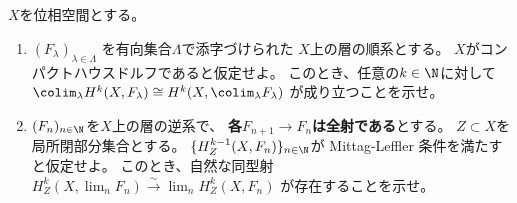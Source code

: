 \documentclass[uplatex,dvipdfmx]{jsarticle}
\begin{document}
\maketitle
\HeaderCommentA
\section{}

\fi



\begin{prob}\label{2.12}
  \(X\)を位相空間とする。
  \begin{enumerate}
    \item \label{2.12.1}
    \((F_{\lambda})_{\lambda\in \Lambda}\)
    を有向集合\(\Lambda\)で添字づけられた
    \(X\)上の層の順系とする。
    \(X\)がコンパクトハウスドルフであると仮定せよ。
    このとき、任意の\(k\in \N\)に対して
    \(\colim_{\lambda}H^k(X,F_{\lambda}) \cong
    H^k(X,\colim_{\lambda}F_{\lambda})\)
    が成り立つことを示せ。
    \item \label{2.12.2}
    \((F_n)_{n\in \N}\)を\(X\)上の層の逆系で、
    \textbf{各\(F_{n+1}\to F_n\)は全射である}とする。
    \(Z\subset X\)を局所閉部分集合とする。
    \(\{H^{k-1}_Z(X,F_n)\}_{n\in \N}\)が Mittag-Leffler 条件を満たすと仮定せよ。
    このとき、自然な同型射
    \(H^k_Z(X,\lim_nF_n)\xrightarrow{\sim} \lim_nH^k_Z(X,F_n)\)
    が存在することを示せ。
  \end{enumerate}
\end{prob}
\end{document}
